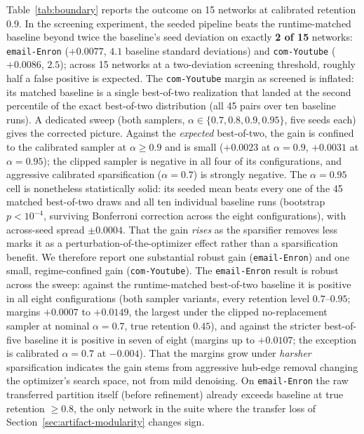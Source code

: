 \documentclass[10pt,journal,compsoc]{IEEEtran}
\begin{document}
Table~\ref{tab:boundary} reports the outcome on 15 networks at calibrated retention $0.9$.
In the screening experiment, the seeded pipeline beats the runtime-matched baseline beyond twice the baseline's seed deviation on exactly \textbf{2 of 15} networks: \texttt{email-Enron} ($+0.0077$, $4.1$ baseline standard deviations) and \texttt{com-Youtube} ($+0.0086$, $2.5$); across 15 networks at a two-deviation screening threshold, roughly half a false positive is expected.
The \texttt{com-Youtube} margin as screened is inflated: its matched baseline is a single best-of-two realization that landed at the second percentile of the exact best-of-two distribution (all 45 pairs over ten baseline runs). A dedicated sweep (both samplers, $\alpha \in \{0.7, 0.8, 0.9, 0.95\}$, five seeds each) gives the corrected picture. Against the \emph{expected} best-of-two, the gain is confined to the calibrated sampler at $\alpha \ge 0.9$ and is small ($+0.0023$ at $\alpha = 0.9$, $+0.0031$ at $\alpha = 0.95$); the clipped sampler is negative in all four of its configurations, and aggressive calibrated sparsification ($\alpha = 0.7$) is strongly negative. The $\alpha = 0.95$ cell is nonetheless statistically solid: its seeded mean beats every one of the 45 matched best-of-two draws and all ten individual baseline runs (bootstrap $p < 10^{-4}$, surviving Bonferroni correction across the eight configurations), with across-seed spread $\pm 0.0004$. That the gain \emph{rises} as the sparsifier removes less marks it as a perturbation-of-the-optimizer effect rather than a sparsification benefit. We therefore report one substantial robust gain (\texttt{email-Enron}) and one small, regime-confined gain (\texttt{com-Youtube}).
The \texttt{email-Enron} result is robust across the sweep: against the runtime-matched best-of-two baseline it is positive in all eight configurations (both sampler variants, every retention level $0.7$--$0.95$; margins $+0.0007$ to $+0.0149$, the largest under the clipped no-replacement sampler at nominal $\alpha = 0.7$, true retention $0.45$), and against the stricter best-of-five baseline it is positive in seven of eight (margins up to $+0.0107$; the exception is calibrated $\alpha = 0.7$ at $-0.004$). That the margins grow under \emph{harsher} sparsification indicates the gain stems from aggressive hub-edge removal changing the optimizer's search space, not from mild denoising.
On \texttt{email-Enron} the raw transferred partition itself (before refinement) already exceeds baseline at true retention $\ge 0.8$, the only network in the suite where the transfer loss of Section~\ref{sec:artifact-modularity} changes sign.
\end{document}
